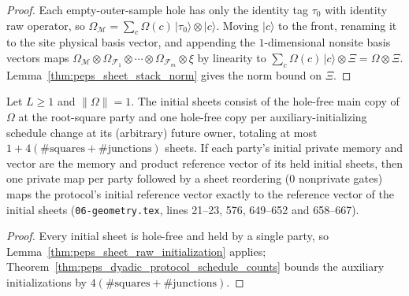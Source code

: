 \begin{proof}\leanok
    Each empty-outer-sample hole has only the identity tag $\tau_0$ with identity raw operator, so $\Omega_{\mathcal M}=\sum_c\Omega(c)\,\lvert\tau_0\rangle\otimes\lvert c\rangle$. Moving $\lvert c\rangle$ to the front, renaming it to the site physical basis vector, and appending the $1$-dimensional nonsite basis vectors maps $\Omega_{\mathcal M}\otimes\Omega_{\mathcal F_1}\otimes\cdots\otimes\Omega_{\mathcal F_m}\otimes\xi$ by linearity to $\sum_c\Omega(c)\,\lvert c\rangle\otimes\Xi=\Omega\otimes\Xi$. Lemma~\ref{thm:peps_sheet_stack_norm} gives the norm bound on $\Xi$.
\end{proof}

\begin{lemma}
    \label{thm:peps_dyadic_protocol_initial_step}
    \leanok
    Let $L\ge1$ and $\lVert\Omega\rVert=1$. The initial sheets consist of the hole-free main copy of $\Omega$ at the root-square party and one hole-free copy per auxiliary-initializing schedule change at its (arbitrary) future owner, totaling at most $1+4(\#\text{squares}+\#\text{junctions})$ sheets. If each party's initial private memory and vector are the memory and product reference vector of its held initial sheets, then one private map per party followed by a sheet reordering ($0$ nonprivate gates) maps the protocol's initial reference vector exactly to the reference vector of the initial sheets (\texttt{06-geometry.tex}, lines 21--23, 576, 649--652 and 658--667).
\end{lemma}

\begin{proof}\leanok
    Every initial sheet is hole-free and held by a single party, so Lemma~\ref{thm:peps_sheet_raw_initialization} applies; Theorem~\ref{thm:peps_dyadic_protocol_schedule_counts} bounds the auxiliary initializations by $4(\#\text{squares}+\#\text{junctions})$.
\end{proof}

